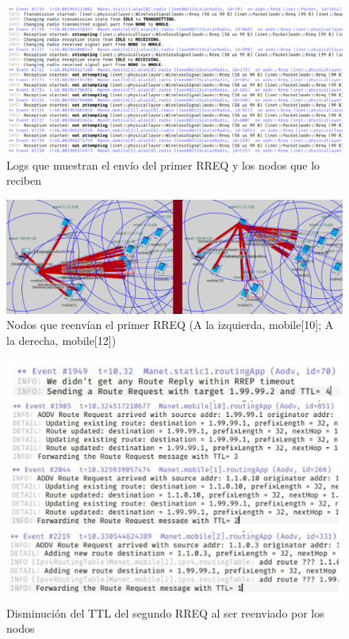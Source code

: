 \begin{figure}[H]
    \centering
    \includegraphics[width=125mm, scale=0.75]{imaxes/aodv/ejercicio1_1.png}
    \caption{Logs que muestran el envío del primer RREQ y los nodos que lo reciben}
    \label{fig:primer_rreq_reception}
\end{figure}

\begin{figure}[H]
    \centering
    \includegraphics[width=125mm, scale=0.75]{imaxes/aodv/ejercicio1_2.png}
    \caption{Nodos que reenvían el primer RREQ (A la izquierda, mobile[10]; A la derecha, mobile[12])}
    \label{fig:primer_rreq_transmission}
\end{figure}

\begin{figure}[H]
    \centering
    \includegraphics[width=125mm, scale=0.75]{imaxes/aodv/ejercicio1_4.jpg}
    \caption{Disminución del TTL del segundo RREQ al ser reenviado por los nodos}
    \label{fig:ttldisminucion}
\end{figure}

